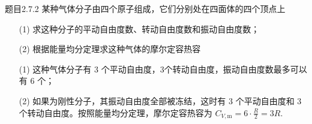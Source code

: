 \begin{question}{题目2.7.2}
    某种气体分子由四个原子组成，它们分别处在四面体的四个顶点上
    \begin{enumerate}
        \item[(1)] 求这种分子的平动自由度数、转动自由度数和振动自由度数；
        \item[(2)] 根据能量均分定理求这种气体的摩尔定容热容
    \end{enumerate}
\end{question}

\begin{solution}
    \begin{itemize}
        \item[(1)] 这种气体分子有 $3$ 个平动自由度，$3$个转动自由度，振动自由度数最多可以有 $6$ 个；
        \item[(2)] 如果为刚性分子，其振动自由度全部被冻结，这时有 $3$ 个平动自由度和 $3$ 个转动自由度。按照能量均分定理，摩尔定容热容为 $C_{V,\mathrm{m}} = 6 \cdot \frac{R}{2} = 3R$.
    \end{itemize}
\end{solution}